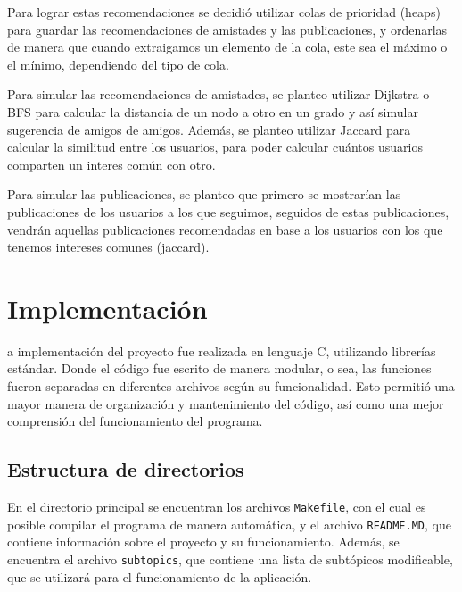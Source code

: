 \documentclass[9pt,letterpaper,onecolumn]{rho-class/rho}
\begin{document}
    Para lograr estas recomendaciones se decidió utilizar colas de prioridad (heaps) para guardar las recomendaciones de amistades y las publicaciones, y ordenarlas de manera que cuando extraigamos un elemento de la cola, este sea el máximo o el mínimo, dependiendo del tipo de cola.
    
    Para simular las recomendaciones de amistades, se planteo utilizar Dijkstra o BFS para calcular la distancia de un nodo a otro en un grado y así simular sugerencia de amigos de amigos. Además, se planteo utilizar Jaccard para calcular la similitud entre los usuarios, para poder calcular cuántos usuarios comparten un interes común con otro.

    Para simular las publicaciones, se planteo que primero se mostrarían las publicaciones de los usuarios a los que seguimos, seguidos de estas publicaciones, vendrán aquellas publicaciones recomendadas en base a los usuarios con los que tenemos intereses comunes (jaccard).

\newpage
\section{Implementación}

    a implementación del proyecto fue realizada en lenguaje C, utilizando librerías estándar. Donde el código fue escrito de manera modular, o sea, las funciones fueron separadas en diferentes archivos según su funcionalidad. Esto permitió una mayor manera de organización y mantenimiento del código, así como una mejor comprensión del funcionamiento del programa.

    \subsection{Estructura de directorios}
    En el directorio principal se encuentran los archivos \texttt{Makefile}, con el cual es posible compilar el programa de manera automática, y el archivo \texttt{README.MD}, que contiene información sobre el proyecto y su funcionamiento. Además, se encuentra el archivo \texttt{subtopics}, que contiene una lista de subtópicos modificable, que se utilizará para el funcionamiento de la aplicación.

    \vspace{0.5cm}
\end{document}
